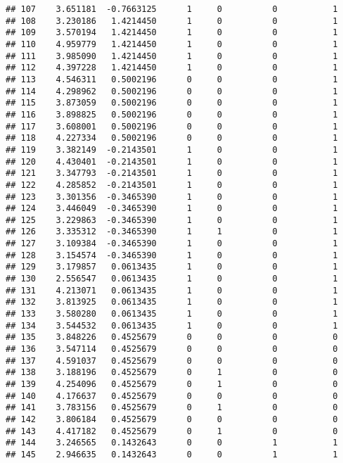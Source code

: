 \documentclass[
]{article}
\begin{document}
\begin{verbatim}
## 107    3.651181  -0.7663125      1     0          0           1
## 108    3.230186   1.4214450      1     0          0           1
## 109    3.570194   1.4214450      1     0          0           1
## 110    4.959779   1.4214450      1     0          0           1
## 111    3.985090   1.4214450      1     0          0           1
## 112    4.397228   1.4214450      1     0          0           1
## 113    4.546311   0.5002196      0     0          0           1
## 114    4.298962   0.5002196      0     0          0           1
## 115    3.873059   0.5002196      0     0          0           1
## 116    3.898825   0.5002196      0     0          0           1
## 117    3.608001   0.5002196      0     0          0           1
## 118    4.227334   0.5002196      0     0          0           1
## 119    3.382149  -0.2143501      1     0          0           1
## 120    4.430401  -0.2143501      1     0          0           1
## 121    3.347793  -0.2143501      1     0          0           1
## 122    4.285852  -0.2143501      1     0          0           1
## 123    3.301356  -0.3465390      1     0          0           1
## 124    3.446049  -0.3465390      1     0          0           1
## 125    3.229863  -0.3465390      1     0          0           1
## 126    3.335312  -0.3465390      1     1          0           1
## 127    3.109384  -0.3465390      1     0          0           1
## 128    3.154574  -0.3465390      1     0          0           1
## 129    3.179857   0.0613435      1     0          0           1
## 130    2.556547   0.0613435      1     0          0           1
## 131    4.213071   0.0613435      1     0          0           1
## 132    3.813925   0.0613435      1     0          0           1
## 133    3.580280   0.0613435      1     0          0           1
## 134    3.544532   0.0613435      1     0          0           1
## 135    3.848226   0.4525679      0     0          0           0
## 136    3.547114   0.4525679      0     0          0           0
## 137    4.591037   0.4525679      0     0          0           0
## 138    3.188196   0.4525679      0     1          0           0
## 139    4.254096   0.4525679      0     1          0           0
## 140    4.176637   0.4525679      0     0          0           0
## 141    3.783156   0.4525679      0     1          0           0
## 142    3.806184   0.4525679      0     0          0           0
## 143    4.417182   0.4525679      0     1          0           0
## 144    3.246565   0.1432643      0     0          1           1
## 145    2.946635   0.1432643      0     0          1           1

\end{verbatim}
\end{document}
